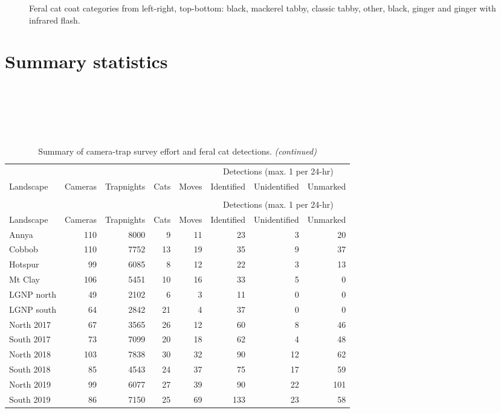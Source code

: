 \documentclass[11pt,a4paper,titlepage,twoside,openright]{style/unimelbthesis}
\begin{document}
\begin{mainmatter}
\begin{figure}
{}

\caption{Feral cat coat categories from left-right, top-bottom: black, mackerel tabby, classic tabby, other, black, ginger and ginger with infrared flash.}\label{fig:density-cat-photo}
\end{figure}
\newpage

\hypertarget{summary-statistics}{%
\section{Summary statistics}\label{summary-statistics}}

\(~\)

\(~\)

\(~\)

\begingroup\fontsize{10}{12}\selectfont
\begin{longtable}[t]{lrrrrrrr}
\caption{\label{tab:density-stats}Summary of camera-trap survey effort and feral cat detections.}\\
\toprule
\multicolumn{5}{c}{ } & \multicolumn{3}{c}{Detections (max. 1 per 24-hr)} \\
\cmidrule(l{3pt}r{3pt}){6-8}
Landscape & Cameras & Trapnights & Cats & Moves & Identified & Unidentified & Unmarked\\
\midrule
\endfirsthead
\caption[]{\label{tab:density-stats}Summary of camera-trap survey effort and feral cat detections. \textit{(continued)}}\\
\toprule
\multicolumn{5}{c}{ } & \multicolumn{3}{c}{Detections (max. 1 per 24-hr)} \\
\cmidrule(l{3pt}r{3pt}){6-8}
Landscape & Cameras & Trapnights & Cats & Moves & Identified & Unidentified & Unmarked\\
\midrule
\endhead

\endfoot
\bottomrule
\endlastfoot
Annya & 110 & 8000 & 9 & 11 & 23 & 3 & 20\\
Cobbob & 110 & 7752 & 13 & 19 & 35 & 9 & 37\\
Hotspur & 99 & 6085 & 8 & 12 & 22 & 3 & 13\\
Mt Clay & 106 & 5451 & 10 & 16 & 33 & 5 & 0\\
LGNP north & 49 & 2102 & 6 & 3 & 11 & 0 & 0\\
\addlinespace
LGNP south & 64 & 2842 & 21 & 4 & 37 & 0 & 0\\
North 2017 & 67 & 3565 & 26 & 12 & 60 & 8 & 46\\
South 2017 & 73 & 7099 & 20 & 18 & 62 & 4 & 48\\
North 2018 & 103 & 7838 & 30 & 32 & 90 & 12 & 62\\
South 2018 & 85 & 4543 & 24 & 37 & 75 & 17 & 59\\
\addlinespace
North 2019 & 99 & 6077 & 27 & 39 & 90 & 22 & 101\\
South 2019 & 86 & 7150 & 25 & 69 & 133 & 23 & 58\\*
\end{longtable}
\endgroup{}


\end{mainmatter}
\end{document}
